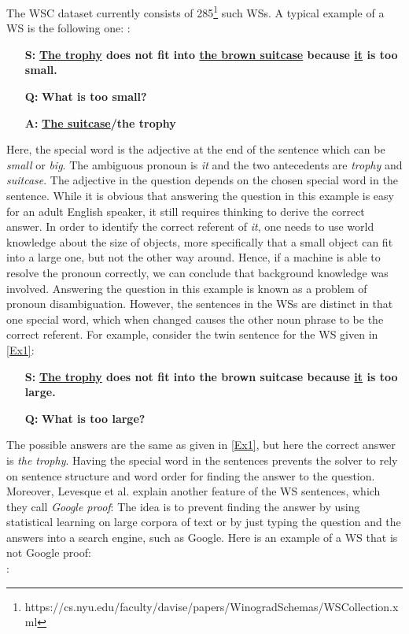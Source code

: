 The WSC dataset currently consists of 285\footnote{https://cs.nyu.edu/faculty/davise/papers/WinogradSchemas/WSCollection.xml} such WSs.
A typical example of a WS is the following one:
:
\begin{itemize} 
	\item[\textbf{S:}] \textbf{\underline{The trophy} does not fit into \underline{the brown suitcase} because \underline{it} is too small.}
	\item[\textbf{Q:}] \textbf{What is too small?}
	\item[\textbf{A:}] \textbf{\underline{The suitcase}/the trophy}
\end{itemize}

Here, the special word is the adjective at the end of the sentence which can be \textit{small} or \textit{big}. The ambiguous pronoun is \textit{it} and the two antecedents are \textit{trophy} and \textit{suitcase}. The adjective in the question depends on the chosen special word in the sentence. While it is obvious that answering the question in this example is easy for an adult English speaker, it still requires thinking to derive the correct answer. In order to identify the correct referent of \textit{it}, one needs to use world knowledge about the size of objects, more specifically that a small object can fit into a large one, but not the other way around. Hence, if a machine is able to resolve the pronoun correctly, we can conclude that background knowledge was involved. Answering the question in this example is known as a problem of pronoun disambiguation. However, the sentences in the WSs are distinct in that one special word, which when changed causes the other noun phrase to be the correct referent. For example, consider the twin sentence for the WS given in \ref{Ex1}:
\begin{itemize} 
	\item[\textbf{S:}] \textbf{\underline{The trophy} does not fit into the brown suitcase because \underline{it} is too large.}
	\item[\textbf{Q:}] \textbf{What is too large?}
\end{itemize}

The possible answers are the same as given in \ref{Ex1}, but here the correct answer is \textit{the trophy}. Having the special word in the sentences prevents the solver to rely on sentence structure and word order for finding the answer to the question. 
Moreover, Levesque et al. \cite{DBLP:conf/kr/LevesqueDM12} explain another feature of the WS sentences, which they call \textit{Google proof}: The idea is to prevent finding the answer by using statistical learning on large corpora of text or by just typing the question and the answers into a search engine, such as Google. 
Here is an example of a WS that is not Google proof:\\
:

